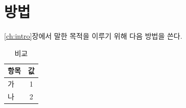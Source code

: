 \chapter{방법}\label{ch:method}
\ref{ch:intro}장에서 말한 목적을 이루기 위해 다음 방법을 쓴다\cite{lamport1994}.

\begin{table}[h]
  \centering
  \caption{비교}\label{tab:compare}
  \begin{tabular}{lc}
    \toprule
    항목 & 값 \\
    \midrule
    가 & 1 \\
    나 & 2 \\
    \bottomrule
  \end{tabular}
\end{table}
